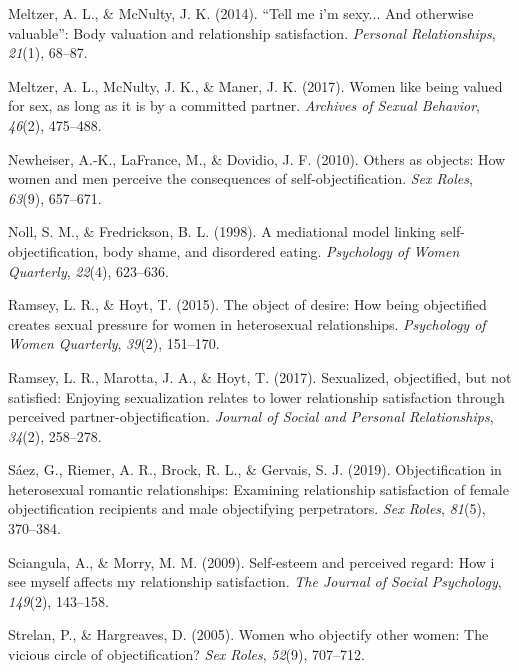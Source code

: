 \documentclass[
  man]{apa6}
\newlength{\cslhangindent}
\newlength{\cslentryspacingunit} %
\newenvironment{CSLReferences}[2] %
 {%
  \setlength{\parindent}{0pt}
  \ifodd #1
  \let\oldpar\par
  \def\par{\hangindent=\cslhangindent\oldpar}
  \fi
  \setlength{\parskip}{#2\cslentryspacingunit}
 }%
 {}
\begin{document}
\begin{CSLReferences}{1}{0}
\leavevmode{}%
Meltzer, A. L., \& McNulty, J. K. (2014). {``Tell me i'm sexy... And otherwise valuable''}: Body valuation and relationship satisfaction. \emph{Personal Relationships}, \emph{21}(1), 68--87.

\leavevmode{}%
Meltzer, A. L., McNulty, J. K., \& Maner, J. K. (2017). Women like being valued for sex, as long as it is by a committed partner. \emph{Archives of Sexual Behavior}, \emph{46}(2), 475--488.

\leavevmode{}%
Newheiser, A.-K., LaFrance, M., \& Dovidio, J. F. (2010). Others as objects: How women and men perceive the consequences of self-objectification. \emph{Sex Roles}, \emph{63}(9), 657--671.

\leavevmode{}%
Noll, S. M., \& Fredrickson, B. L. (1998). A mediational model linking self-objectification, body shame, and disordered eating. \emph{Psychology of Women Quarterly}, \emph{22}(4), 623--636.

\leavevmode{}%
Ramsey, L. R., \& Hoyt, T. (2015). The object of desire: How being objectified creates sexual pressure for women in heterosexual relationships. \emph{Psychology of Women Quarterly}, \emph{39}(2), 151--170.

\leavevmode{}%
Ramsey, L. R., Marotta, J. A., \& Hoyt, T. (2017). Sexualized, objectified, but not satisfied: Enjoying sexualization relates to lower relationship satisfaction through perceived partner-objectification. \emph{Journal of Social and Personal Relationships}, \emph{34}(2), 258--278.

\leavevmode{}%
Sáez, G., Riemer, A. R., Brock, R. L., \& Gervais, S. J. (2019). Objectification in heterosexual romantic relationships: Examining relationship satisfaction of female objectification recipients and male objectifying perpetrators. \emph{Sex Roles}, \emph{81}(5), 370--384.

\leavevmode{}%
Sciangula, A., \& Morry, M. M. (2009). Self-esteem and perceived regard: How i see myself affects my relationship satisfaction. \emph{The Journal of Social Psychology}, \emph{149}(2), 143--158.

\leavevmode{}%
Strelan, P., \& Hargreaves, D. (2005). Women who objectify other women: The vicious circle of objectification? \emph{Sex Roles}, \emph{52}(9), 707--712.


\end{CSLReferences}
\end{document}
